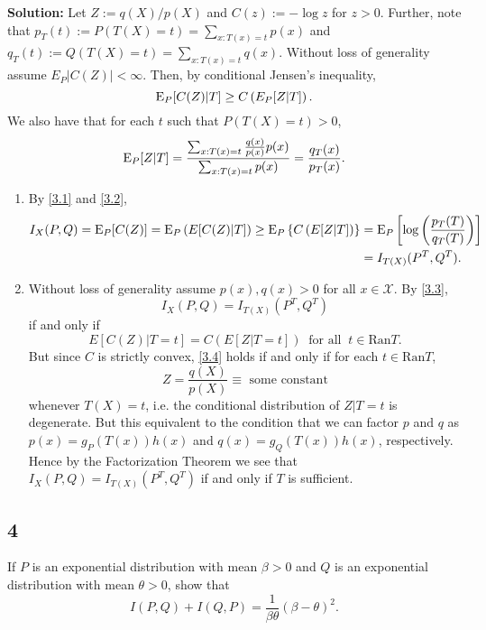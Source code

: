 \documentclass[12pt]{article}
\begin{document}
\textbf{Solution:} Let $Z := q(X) / p(X)$ and $C(z) := -\log z$ for $z > 0$. Further, note that $p_T(t) := P(T(X)=t) = \sum_{x : T(x)=t} p(x)$ and 
$q_T(t) := Q(T(X)=t) = \sum_{x : T(x)=t} q(x)$.
Without loss of generality assume $E_{P}|C(Z)| < \infty$. Then, by
conditional Jensen's inequality,
\begin{equation}
  \mathrm{E}_P[C(Z)|T] \geq C\left( E_P[Z|T] \right).
  \label{3.1}
\end{equation}
We also have that for each $t$ such that $P(T(X) = t) > 0$,
\begin{equation}
  \mathrm{E}_P[Z|T] = \frac{\sum_{x:T(x) = t}\frac{q(x)}{p(x)}p(x) }{\sum_{x:T(x) = t}p(x)} = \frac{q_{T}(x)}{p_T(x)}.
  \label{3.2}
\end{equation}
\begin{enumerate}
  \item By \eqref{3.1} and \eqref{3.2},
    \begin{align}
      I_{X}(P,Q) = \mathrm{E}_P[C(Z)] = \mathrm{E}_{P}\left( E[C(Z)|T] \right) \geq \mathrm{E}_P\left\{ C\left( E[Z|T] \right) \right\} & = \mathrm{E}_P\left[
      \log\left(\frac{p_T(T)}{q_T(T)}\right) \right] \nonumber \\
      & = I_{T(X)}(P^{T},Q^{T}).
      \label{3.3}
    \end{align}

  \item Without loss of generality assume $p(x), q(x) > 0$ for all $x \in \mathcal{X}$.
    By \eqref{3.3}, 
    \[
      I_X(P,Q) = I_{T(X)}(P^T, Q^T)
    \]
    if and only if 
    \begin{equation}
      E[C(Z)|T=t] = C\left( E[Z|T=t] \right)\  \text{ for all }\ t \in \mathrm{Ran} T.
      \label{3.4}
    \end{equation}
    But since $C$ is strictly convex, \eqref{3.4} holds if and only if for each $t \in \mathrm{Ran} T$, 
    \[
      Z = \frac{q(X)}{p(X)} \equiv \text{ some constant} 
    \]
    whenever $T(X) = t$, i.e. the conditional distribution of $Z | T = t$ is
    degenerate. But this equivalent to the condition that we can factor $p$ and $q$ as $p(x) = g_P(T(x))h(x)$ and $q(x) = g_Q(T(x))h(x)$, respectively.
    Hence by the Factorization Theorem we see that $I_X(P,Q) = I_{T(X)}(P^{T}, Q^{T})$ if and only if $T$ is sufficient.

\end{enumerate}



\newpage
\subsection*{4}
\begin{tcolorbox}
  If $P$ is an exponential distribution with mean $\beta>0$ and $Q$ is an exponential distribution with mean $\theta>0$, show that
  \[
    I(P,Q)+I(Q,P) = \frac{1}{\beta \theta} (\beta-\theta)^2.
  \]
\end{tcolorbox}
\end{document}
